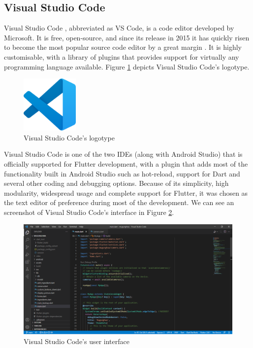 \subsection{Visual Studio Code}

Visual Studio Code \cite{noauthor_documentation_2021}, abbreviated as VS Code, is a code editor developed by Microsoft. It is free, open-source, and since its release in 2015 it has quickly risen to become the most popular source code editor by a great margin \cite{noauthor_stack_nodate}. It is highly customisable, with a library of plugins that provides support for virtually any programming language available. Figure \ref{fig:vscode-logo} depicts Visual Studio Code's logotype.

\begin{figure}[h]
  \centering
  \includegraphics[width=0.25\textwidth]{Figures/vscode-logo.png}
  \caption{%
    Visual Studio Code's logotype
  }
  \label{fig:vscode-logo}
\end{figure}

Visual Studio Code is one of the two IDEs (along with Android Studio) that is officially supported for Flutter development, with a plugin that adds most of the functionality built in Android Studio such as hot-reload, support for Dart and several other coding and debugging options. Because of its simplicity, high modularity, widespread usage and complete support for Flutter, it was chosen as the text editor of preference during most of the development. We can see an screenshot of Visual Studio Code's interface in Figure \ref{fig:vscode-screen}.

\begin{figure}[h]
  \centering
  \includegraphics[width=\textwidth]{Figures/vscode-screen.png}
  \caption{%
    Visual Studio Code's user interface
  }
  \label{fig:vscode-screen}
\end{figure}

